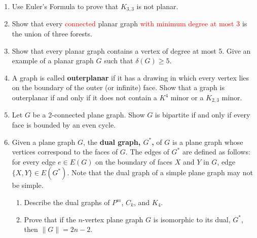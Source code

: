 \documentclass[12pt]{article}
\renewcommand{\emph}[1]{\textsf{\textbf{#1}}}
\begin{document}
\begin{enumerate}
	\item Use Euler's Formula to prove that $K_{3,3}$ is not planar.
	\item Show that every \textcolor{red}{connected} planar graph \textcolor{red}{with minimum degree at most 3} is the union of three forests. 
	\item Show that every planar graph contains a vertex of degree at most 5. Give an example of a planar graph $G$ such that $\delta(G) \geq 5.$
	\item A graph is called \emph{outerplanar} if it has a drawing in which every vertex lies on the boundary of the outer (or infinite) face. Show that a graph is outerplanar if and only if it does not contain a $K^4$ minor or a $K_{2,3}$ minor.
	\item Let $G$ be a 2-connected plane graph. Show $G$ is bipartite if and only if every face is bounded by an even cycle.
	\item Given a plane graph $G$, the \emph{dual graph, $G^*$,} of $G$ is a plane graph whose vertices correspond to the faces of $G$. The edges of $G^*$ are defined as follows: for every edge $e \in E(G)$ on the boundary of faces $X$ and $Y$ in $G$, edge $\{X,Y\} \in E(G^*).$ Note that the dual graph of a simple plane graph may not be simple.
	\begin{enumerate}
	\item Describe the dual graphs of $P^m$, $C_k$, and $K_4.$
	\item Prove that if the $n$-vertex plane graph $G$ is isomorphic to its dual, $G^*$, then $\parallel G \parallel = 2n-2.$
	\end{enumerate}
\end{enumerate}
\end{document}
